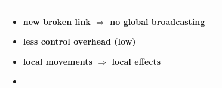 \begin{center}
\begin{tabular}{|p{5.5cm}|p{5.5cm}|}
\begin{minipage}{1 \textwidth}
\begin{itemize}
                \vspace*{0.15cm}
                \item new broken link $\Rightarrow$ no global \newline\hspace*{-0.5cm}broadcasting
                \vspace*{0.15cm}
                \item less control overhead (low)
                \vspace*{0.15cm}
                \item local movements $\Rightarrow$ local effects
                \item[]
            \end{itemize}
        \end{minipage}
        \\
        \hline
    \end{tabular}
\end{center}

